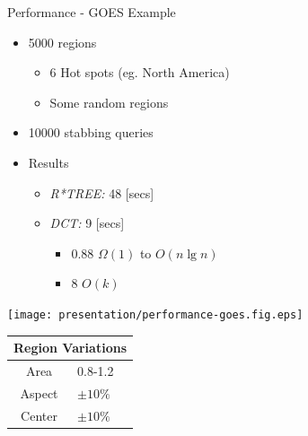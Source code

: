 \documentclass[final,total,bgColor,slideColor,pdf,ps2pdf,default,noaccumulate]{prosper}
\begin{document}
\begin{slide}[R]{Performance - GOES Example}
  \begin{minipage}[c]{6cm}
    \begin{itemize}
    \item 5000 regions
      \begin{itemize}
      \item 6 Hot spots (eg. North America) 
      \item Some random regions
      \end{itemize}
    \item 10000 stabbing queries
    \item Results
      \begin{itemize}
      \item \emph{R*TREE:} 48 [secs]
      \item \emph{DCT:} 9 [secs]
        \begin{itemize}
        \item 0.88 $\Omega(1)$ to $O(n\lg{n})$
        \item 8    $O(k)$
        \end{itemize}
      \end{itemize}
    \end{itemize}
  \end{minipage}
   \begin{minipage}[c]{5cm}
    \texttt{[image: presentation/performance-goes.fig.eps]}
    \par
    \begin{tabular}[b]{|cl|}
      \multicolumn{2}{c}{Region Variations} \\
      \hline
      Area & 0.8-1.2 \\
      Aspect & $\pm 10\%$ \\
      Center & $\pm 10\%$ \\ 
      \hline
    \end{tabular}
  \end{minipage}
\end{slide}
\end{document}
